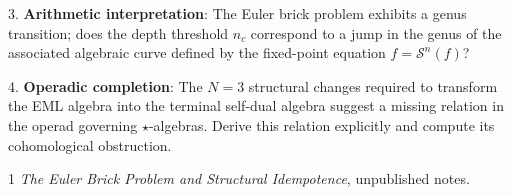 \documentclass{article}
\begin{document}
3. \textbf{Arithmetic interpretation}: The Euler brick problem exhibits a genus transition; does the depth threshold $n_c$ correspond to a jump in the genus of the associated algebraic curve defined by the fixed-point equation $f = \mathcal{S}^n(f)$?

4. \textbf{Operadic completion}: The $N=3$ structural changes required to transform the EML algebra into the terminal self-dual algebra suggest a missing relation in the operad governing $\star$-algebras. Derive this relation explicitly and compute its cohomological obstruction.

\begin{thebibliography}{1}
 \textit{The Euler Brick Problem and Structural Idempotence}, unpublished notes.
\end{thebibliography}
\end{document}
